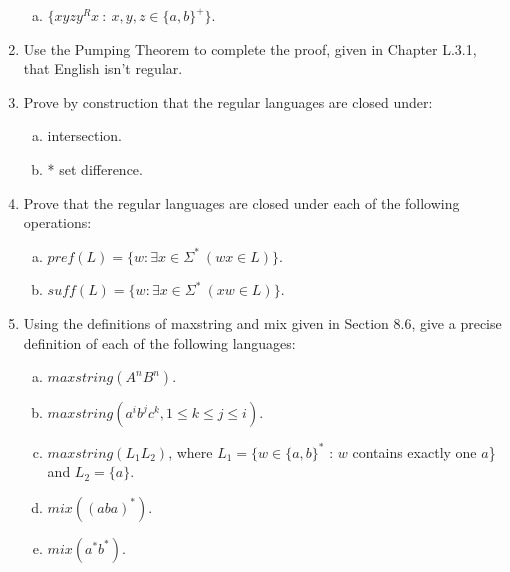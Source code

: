 \documentclass[10pt]{article}
\begin{document}
\begin{enumerate}[1)]
\begin{enumerate}[a)]
\item
$\{xyzy^Rx\ :\ x, y, z \in \{a, b\}^+\}$.
\end{enumerate}



\item
Use the Pumping Theorem to complete the proof, given in Chapter L.3.1, that English isn’t regular.


\item
Prove by construction that the regular languages are closed under:

\begin{enumerate}[a)]
\item
intersection.
 
\item
* set difference.
\end{enumerate}

\item
Prove that the regular languages are closed under each of the following operations:
\begin{enumerate}[a)]
\item
$pref(L) = \{w: \exists x \in \Sigma ^*\ (wx \in L)\}$.

\item
$suff(L) = \{w: \exists x \in \Sigma ^*\ (xw \in L)\}$.
\end{enumerate}



\item
Using the definitions of  maxstring and  mix given in Section  8.6, give a precise definition of each of the 
following languages:

\begin{enumerate}[a)]
\item
$maxstring(A^nB^n)$.

\item
$maxstring(a^ib^jc^k, 1 \leq k \leq j \leq i)$.

\item
$maxstring(L_1L_2)$, where $L_1 = \{w \in \{a, b\}^*$ : $w$ contains exactly one $a$\} and $L_2 = \{a\}$.

\item
$mix((aba)^*)$.

\item
$mix(a^*b^*)$.
\end{enumerate}



\end{enumerate}
\end{document}
